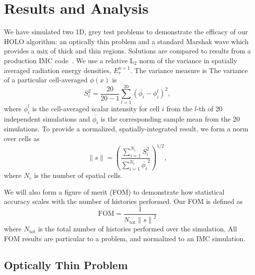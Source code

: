 \documentclass{anstrans}
\newcommand{\FOM}{\ensuremath{\text{FOM}}}
\renewcommand{\ss}{\ensuremath{\|s\|}}
\begin{document}
\section*{Results and Analysis}

We have simulated two 1D, grey test problems to demonstrate the efficacy of our HOLO
algorithm: an optically thin problem and a standard Marshak wave which provides a mix of thick and
thin regions.  Solutions are compared to results from a production IMC code~\cite{jayenne}.
We use a relative L$_2$ norm of the variance in spatially averaged radiation energy densities, $E_r^{n+1}$. The variance measure is
The variance of a particular cell-averaged $\phi(x)$ is 
\begin{equation} 
    S_i^2 =  \frac{20}{20-1} \sum_{l=1}^{20} \left(\overline{\phi_{i}} -
    \phi_{i}^l\right)^2,
\end{equation}
where $\phi_{i}^l$ is the cell-averaged scalar intensity for cell $i$ from the $l$-th of 20 independent simulations and
$\overline{\phi_{i}}$ is the corresponding sample mean from the 20 simulations. To
provide a normalized, spatially-integrated result, we form a norm over cells as 
\begin{equation}
    \ss = \left({\frac{\sum\limits_{i=1}^{N_c}
S_i^2}{\sum\limits_{i=1}^{N_c}\overline{\phi_{i}}^2}}\right)^{1/2},
\end{equation}
where $N_c$ is the number of spatial cells. 

We will also form a figure of merit (FOM) to demonstrate how statistical accuracy
scales with the number of histories performed.  Our FOM is defined as
\begin{equation}
    \FOM = \frac{1}{N_{\text{tot}}\ss^2}
\end{equation}
where $N_{\text{tot}}$ is the total number of histories performed over the simulation. All FOM results
are particular to a problem, and normalized to an IMC simulation.

\subsection{Optically Thin Problem}
\end{document}

